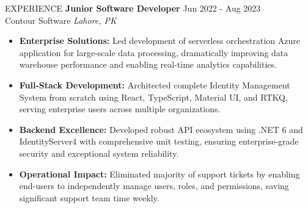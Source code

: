 \documentclass{resume} %
\begin{document}
\begin{rSection}{EXPERIENCE}
\textbf{Junior Software Developer} \hfill Jun 2022 - Aug 2023\\
Contour Software \hfill \textit{Lahore, PK}
 \begin{itemize}
    \itemsep -3pt {} 
     \item \textbf{Enterprise Solutions:} Led development of serverless orchestration Azure application for large-scale data processing, dramatically improving data warehouse performance and enabling real-time analytics capabilities.
     \item \textbf{Full-Stack Development:} Architected complete Identity Management System from scratch using React, TypeScript, Material UI, and RTKQ, serving enterprise users across multiple organizations.
     \item \textbf{Backend Excellence:} Developed robust API ecosystem using .NET 6 and IdentityServer4 with comprehensive unit testing, ensuring enterprise-grade security and exceptional system reliability.
     \item \textbf{Operational Impact:} Eliminated majority of support tickets by enabling end-users to independently manage users, roles, and permissions, saving significant support team time weekly.
 \end{itemize}

\end{rSection} 

\end{document}
